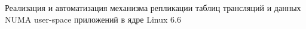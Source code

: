 Реализация и автоматизация механизма репликации таблиц трансляций и данных NUMA user-space приложений в ядре Linux 6.6

